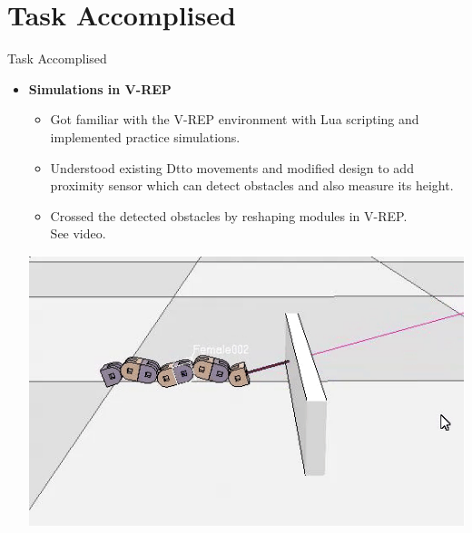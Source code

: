 \documentclass[10pt, a4paper]{beamer}
\begin{document}
\section{Task Accomplised}
\begin{frame}{Task Accomplised}
	\begin{itemize}
		\item \textbf{Simulations in V-REP}
		    \begin{itemize}
		    \item Got familiar with the V-REP environment with Lua scripting and implemented practice simulations.
		    \item Understood existing Dtto movements and modified design to add proximity sensor which can detect obstacles and also measure its height.
		    \item Crossed the detected obstacles by reshaping modules in V-REP. \\ See video.
             \end{itemize}
             \centering\includegraphics[scale=0.45]{detect.png}
	\end{itemize}
\end{frame}
\end{document}
